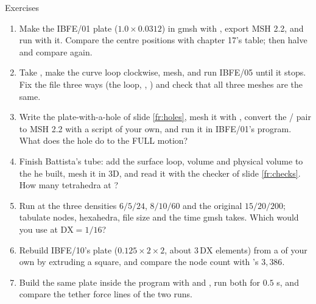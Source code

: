 \documentclass[aspectratio=169,11pt]{beamer}
\begin{document}
\begin{frame}{Exercises}
\label{fr:exercises}
\footnotesize
\begin{enumerate}
  \item Make the IBFE/01 plate ($1.0\times0.0312$) in gmsh with , export MSH 2.2, and run  with it. Compare the centre positions with chapter 17's table; then halve  and compare again.
  \item Take , make the curve loop clockwise, mesh, and run IBFE/05 until it stops. Fix the file three ways (the loop, , ) and check that all three meshes are the same.
  \item Write the plate-with-a-hole  of slide \ref{fr:holes}, mesh it with , convert the / pair to MSH 2.2 with a script of your own, and run it in IBFE/01's program. What does the hole do to the FULL motion?
  \item Finish Battista's tube: add the surface loop, volume and physical volume to the  he built, mesh it in 3D, and read it with the checker of slide \ref{fr:checks}. How many tetrahedra at ?
  \item Run  at the three densities $6/5/24$, $8/10/60$ and the original $15/20/200$; tabulate nodes, hexahedra, file size and the time gmsh takes. Which would you use at $\mathrm{DX} = 1/16$?
  \item Rebuild IBFE/10's plate ($0.125\times2\times2$, about $3\,\mathrm{DX}$ elements) from a  of your own by extruding a square, and compare the node count with 's $3{,}386$.
  \item Build the same plate inside the program with  and , run both for $0.5$ s, and compare the tether force lines of the two runs.
\end{enumerate}
\end{frame}
\end{document}
